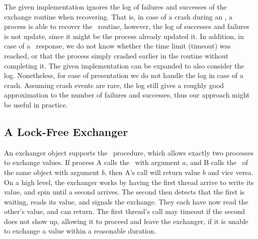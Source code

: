 The given implementation ignores the log of failures and successes of the exchange routine when recovering. That is, in case of a crash during an \exchange, a process is able to recover the \exchange\ routine, however, the log of successes and failures is not update, since it might be the process already updated it. In addition, in case of a \fail\ response, we do not know whether the time limit (timeout) was reached, or that the process simply crashed earlier in the routine without completing it. The given implementation can be expanded to also consider the log. Nonetheless, for ease of presentation we do not handle the log in case of a crash. Assuming crash events are rare, the log still gives a roughly good approximation to the number of failures and successes, thus our approach might be useful in practice.

\subsection{A Lock-Free Exchanger}
An exchanger object supports the \exchange\ procedure, which allows exactly two processes to exchange values. 
If process A calls the \exchange\ with argument $a$, and B calls the \exchange\ of the same object with argument $b$, then A’s call will return value $b$ and vice versa.
On a high level, the exchanger works by having
the first thread arrive to write its value, and spin until a second arrives. The second then detects that the first is waiting, reads its value, and signals the exchange.
They each have now read the other’s value, and can return. The first thread’s call
may timeout if the second does not show up, allowing it to proceed and leave the
exchanger, if it is unable to exchange a value within a reasonable duration.



